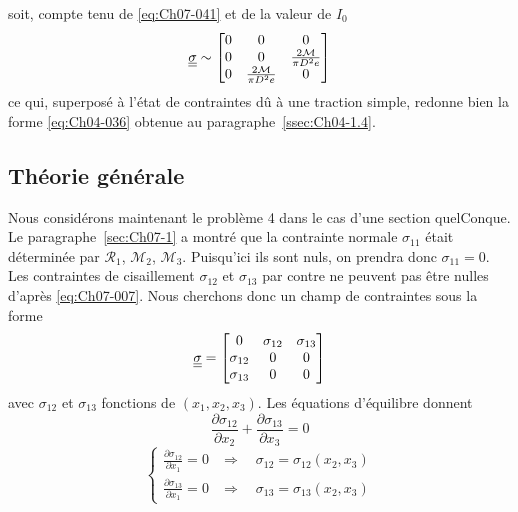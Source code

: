 soit, compte tenu de \eqref{eq:Ch07-041} et de la valeur de $I_0$
\begin{equation}
    \underline{\underline{\sigma}} \sim
    \begin{bmatrix}
        0 & 0 & 0 \\
        0 & 0 & \frac{2\mathcal{M}}{\pi D^2 e} \\
        0 & \frac{2\mathcal{M}}{\pi D^2 e} & 0
    \end{bmatrix}
    \label{eq:Ch07-047}
\end{equation}
ce qui, superposé à l'état de contraintes dû à une traction simple, redonne bien la forme \eqref{eq:Ch04-036} obtenue au paragraphe~\ref{ssec:Ch04-1.4}.
\subsection{Théorie générale}
Nous considérons maintenant le problème 4 dans le cas d'une section quelConque.
Le paragraphe~\ref{sec:Ch07-1} a montré que la contrainte normale $\sigma_{11}$ était déterminée par $\mathcal{R}_1$, $\mathcal{M}_2$, $\mathcal{M}_3$.
Puisqu'ici ils sont nuls, on prendra donc $\sigma_{11}=0$.
Les contraintes de cisaillement $\sigma_{12}$ et $\sigma_{13}$ par contre ne peuvent pas être nulles d'après \eqref{eq:Ch07-007}.
Nous cherchons donc un champ de contraintes sous la forme
\begin{equation}
    \underline{\underline{\sigma}} = 
    \begin{bmatrix}
        0 & \sigma_{12} & \sigma_{13} \\
        \sigma_{12} & 0 & 0\\
        \sigma_{13} & 0 & 0
    \end{bmatrix}
    \label{eq:Ch07-048}
\end{equation}
avec $\sigma_{12}$ et $\sigma_{13}$ fonctions de $\left( x_1, x_2, x_3 \right)$.
Les équations d'équilibre donnent
\begin{equation}
    \frac{\partial \sigma_{12}}{\partial x_2} + \frac{\partial \sigma_{13}}{\partial x_3} = 0
    \label{eq:Ch07-049}
\end{equation}
\begin{equation}
    \begin{cases}
        \frac{\partial \sigma_{12}}{\partial x_1} = 0 & \Rightarrow \quad \sigma_{12} = \sigma_{12} \left( x_2, x_3 \right) \\
        \frac{\partial \sigma_{13}}{\partial x_1} = 0 & \Rightarrow \quad \sigma_{13} = \sigma_{13} \left( x_2, x_3 \right)
    \end{cases}
    \label{eq:Ch07-050}
\end{equation}
